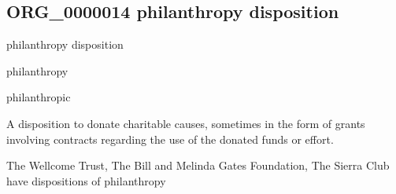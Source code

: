 \documentclass[letterpaper,10pt,english]{sphinxmanual}
\begin{document}
\subsection{ORG\_0000014 \sphinxhyphen{} philanthropy disposition}
\label{\detokenize{doc-ORG_0000014:org-0000014-philanthropy-disposition}}\label{\detokenize{doc-ORG_0000014:index-0}}\label{\detokenize{doc-ORG_0000014::doc}}
\begin{sphinxShadowBox}

\sphinxAtStartPar
philanthropy disposition
\end{sphinxShadowBox}

\begin{sphinxShadowBox}

\sphinxAtStartPar
philanthropy
\end{sphinxShadowBox}

\begin{sphinxShadowBox}

\sphinxAtStartPar
philanthropic
\end{sphinxShadowBox}

\begin{sphinxShadowBox}

\sphinxAtStartPar
{\hyperref[\detokenize{doc-BFO_0000016::doc}]{}}
\end{sphinxShadowBox}

\begin{sphinxShadowBox}

\sphinxAtStartPar
A disposition to donate charitable causes, sometimes in the form of grants involving contracts regarding the use of the donated funds or effort.
\end{sphinxShadowBox}

\begin{sphinxShadowBox}

\sphinxAtStartPar
{}
\end{sphinxShadowBox}

\begin{sphinxShadowBox}

\sphinxAtStartPar
The Wellcome Trust, The Bill and Melinda Gates Foundation, The Sierra Club have dispositions of philanthropy
\end{sphinxShadowBox}
\end{document}
